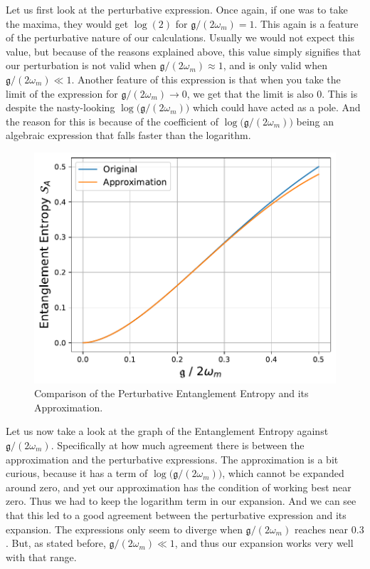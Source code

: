 \documentclass[12pt,a4paper]{report}
\theoremstyle{plain}
\theoremstyle{definition}
\theoremstyle{remark}
\begin{document}
Let us first look at the perturbative expression. Once again, if one was to take the maxima, they would get $\log(2)$ for $\mathfrak{g}/(2\omega_{m}) = 1$. This again is a feature of the perturbative nature of our calculations. Usually we would not expect this value, but because of the reasons explained above, this value simply signifies that our perturbation is not valid when $\mathfrak{g}/(2\omega_{m}) \approx 1$, and is only valid when $\mathfrak{g}/(2\omega_{m}) \ll 1$. Another feature of this expression is that when you take the limit of the expression for $\mathfrak{g}/(2\omega_{m}) \rightarrow 0$, we get that the limit is also $0$. This is despite the nasty-looking $\log\big(\mathfrak{g}/(2\omega_{m})\big)$ which could have acted as a pole. And the reason for this is because of the coefficient of $\log\big(\mathfrak{g}/(2\omega_{m})\big)$ being an algebraic expression that falls faster than the logarithm.

\begin{figure}[h]
    \centering
    \includegraphics[width=12cm]{EEApprox.pdf}
    \caption{Comparison of the Perturbative Entanglement Entropy and its Approximation.}
    \label{fig: EE1}
\end{figure}

Let us now take a look at the graph of the Entanglement Entropy against $\mathfrak{g}/(2\omega_{m})$. Specifically at how much agreement there is between the approximation and the perturbative expressions. The approximation is a bit curious, because it has a term of $\log\big(\mathfrak{g}/(2\omega_{m})\big)$, which cannot be expanded around zero, and yet our approximation has the condition of working best near zero. Thus we had to keep the logarithm term in our expansion. And we can see that this led to a good agreement between the perturbative expression and its expansion. The expressions only seem to diverge when $\mathfrak{g}/(2\omega_{m})$ reaches near $0.3$. But, as stated before, $\mathfrak{g}/(2\omega_{m}) \ll 1$, and thus our expansion works very well with that range.
\end{document}
